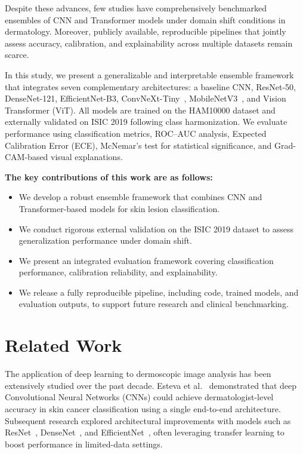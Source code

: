 \documentclass[pdflatex,sn-mathphys-num]{sn-jnl}%
\theoremstyle{thmstyleone}%
\theoremstyle{thmstyletwo}%
\theoremstyle{thmstylethree}%
\begin{document}
Despite these advances, few studies have comprehensively benchmarked ensembles of CNN and Transformer models under domain shift conditions in dermatology. Moreover, publicly available, reproducible pipelines that jointly assess accuracy, calibration, and explainability across multiple datasets remain scarce.

In this study, we present a generalizable and interpretable ensemble framework that integrates seven complementary architectures: a baseline CNN, ResNet-50, DenseNet-121, EfficientNet-B3, ConvNeXt-Tiny~\cite{liu2022convnet}, MobileNetV3~\cite{howard2019searching}, and Vision Transformer (ViT). All models are trained on the HAM10000 dataset and externally validated on ISIC 2019 following class harmonization. We evaluate performance using classification metrics, ROC–AUC analysis, Expected Calibration Error (ECE), McNemar’s test for statistical significance, and Grad-CAM-based visual explanations.

\textbf{The key contributions of this work are as follows:}
\begin{itemize}
    \item We develop a robust ensemble framework that combines CNN and Transformer-based models for skin lesion classification.
    \item We conduct rigorous external validation on the ISIC 2019 dataset to assess generalization performance under domain shift.
    \item We present an integrated evaluation framework covering classification performance, calibration reliability, and explainability.
    \item We release a fully reproducible pipeline, including code, trained models, and evaluation outputs, to support future research and clinical benchmarking.
\end{itemize}

\section{Related Work}\label{sec2}

The application of deep learning to dermoscopic image analysis has been extensively studied over the past decade. 
Esteva et al.~\cite{esteva2017dermatologist} demonstrated that deep Convolutional Neural Networks (CNNs) could achieve dermatologist-level accuracy in skin cancer classification using a single end-to-end architecture. 
Subsequent research explored architectural improvements with models such as ResNet~\cite{he2016deep}, DenseNet~\cite{huang2017densely}, and EfficientNet~\cite{tan2019efficientnet}, often leveraging transfer learning to boost performance in limited-data settings.
\end{document}
